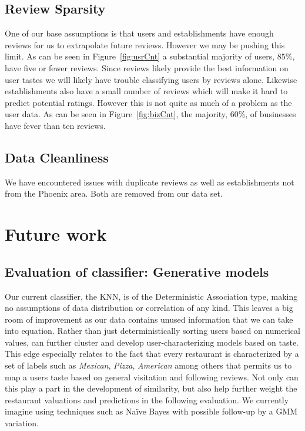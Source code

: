\documentclass[10pt,twocolumn,letterpaper]{article}
\begin{document}
\subsection{Review Sparsity}
One of our base assumptions is that users and establishments have enough reviews for us to extrapolate future reviews. However we may be pushing this limit. As can be seen in Figure~\ref{fig:usrCnt} a substantial majority of users, $85\%$, have five or fewer reviews. Since reviews likely provide the best information on user tastes we will likely have trouble classifying users by reviews alone. Likewise establishments also have a small number of reviews which will make it hard to predict potential ratings. However this is not quite as much of a problem as the user data. As can be seen in Figure~\ref{fig:bizCnt}, the majority, $60\%$, of businesses have fever than ten reviews.

\subsection{Data Cleanliness}
We have encountered issues with duplicate reviews as well as establishments not from the Phoenix area. Both are removed from our data set.


\section{Future work}

\subsection{Evaluation of classifier: Generative models}
Our current classifier, the KNN, is of the Deterministic Association type, making no assumptions of data distribution or correlation of any kind. This leaves a big room of improvement as our data contains unused information that we can take into equation. Rather than just deterministically sorting users based on numerical values, can further cluster and develop user-characterizing models based on taste. This edge especially relates to the fact that every restaurant is characterized by a set of labels such as \textit{Mexican}, \textit{Pizza}, \textit{American} among others that permits us to map a users taste based on general visitation and following reviews. Not only can this play a part in the development of similarity, but also help further weight the restaurant valuations and predictions in the following evaluation. We currently imagine using techniques such as Naïve Bayes with possible follow-up by a GMM variation.
\end{document}
